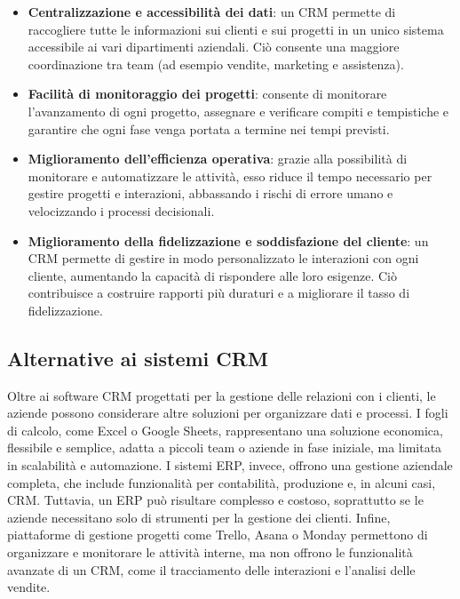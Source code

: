 \documentclass[target=bach,aauheader=,style=]{thud}
\begin{document}
\begin{itemize}
   \item \textbf{Centralizzazione e accessibilità dei dati}: un CRM permette di raccogliere tutte le informazioni sui clienti e sui progetti in un unico sistema accessibile ai vari dipartimenti aziendali. Ciò consente una maggiore coordinazione tra team (ad esempio vendite, marketing e assistenza).

   \item \textbf{Facilità di monitoraggio dei progetti}: consente di monitorare l'avanzamento di ogni progetto, assegnare e verificare compiti e tempistiche e garantire che ogni fase venga portata a termine nei tempi previsti.

   \item \textbf{Miglioramento dell'efficienza operativa}: grazie alla possibilità di monitorare e automatizzare le attività, esso riduce il tempo necessario per gestire progetti e interazioni, abbassando i rischi di errore umano e velocizzando i processi decisionali.

   \item \textbf{Miglioramento della fidelizzazione e soddisfazione del cliente}: un CRM permette di gestire in modo personalizzato le interazioni con ogni cliente, aumentando la capacità di rispondere alle loro esigenze. Ciò contribuisce a costruire rapporti più duraturi e a migliorare il tasso di fidelizzazione.
\end{itemize}

\subsection{Alternative ai sistemi CRM}
Oltre ai software CRM progettati per la gestione delle relazioni con i clienti, le aziende possono considerare altre soluzioni\cite{bergamaschicomparazione} per organizzare dati e processi. I fogli di calcolo, come Excel o Google Sheets, rappresentano una soluzione economica, flessibile e semplice, adatta a piccoli team o aziende in fase iniziale, ma limitata in scalabilità e automazione. I sistemi ERP\cite{marsili2019cloud}, invece, offrono una gestione aziendale completa, che include funzionalità per contabilità, produzione e, in alcuni casi, CRM. Tuttavia, un ERP può risultare complesso e costoso, soprattutto se le aziende necessitano solo di strumenti per la gestione dei clienti. Infine, piattaforme di gestione progetti come Trello, Asana o Monday permettono di organizzare e monitorare le attività interne, ma non offrono le funzionalità avanzate di un CRM, come il tracciamento delle interazioni e l'analisi delle vendite.
\end{document}
